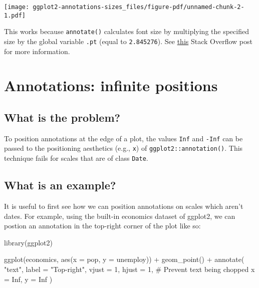 \documentclass[
  letterpaper,
  DIV=11,
  numbers=noendperiod]{scrreprt}
\newenvironment{Shaded}{\begin{snugshade}}{\end{snugshade}}
\newcommand{\AttributeTok}[1]{\textcolor[rgb]{0.40,0.45,0.13}{#1}}
\newcommand{\CommentTok}[1]{\textcolor[rgb]{0.37,0.37,0.37}{#1}}
\newcommand{\ConstantTok}[1]{\textcolor[rgb]{0.56,0.35,0.01}{#1}}
\newcommand{\DecValTok}[1]{\textcolor[rgb]{0.68,0.00,0.00}{#1}}
\newcommand{\FunctionTok}[1]{\textcolor[rgb]{0.28,0.35,0.67}{#1}}
\newcommand{\NormalTok}[1]{\textcolor[rgb]{0.00,0.23,0.31}{#1}}
\newcommand{\SpecialCharTok}[1]{\textcolor[rgb]{0.37,0.37,0.37}{#1}}
\newcommand{\StringTok}[1]{\textcolor[rgb]{0.13,0.47,0.30}{#1}}
\begin{document}
\texttt{[image: ggplot2-annotations-sizes\_files/figure-pdf/unnamed-chunk-2-1.pdf]}

This works because \texttt{annotate()} calculates font size by
multiplying the specified size by the global variable \texttt{.pt}
(equal to \texttt{2.845276}). See
\href{https://stackoverflow.com/questions/65076492/ggplot-size-of-annotate-vs-size-of-element-text}{this}
Stack Overflow post for more information.

\chapter{Annotations: infinite
positions}\label{annotations-infinite-positions}

\section{What is the problem?}\label{what-is-the-problem-1}

To position annotations at the edge of a plot, the values \texttt{Inf}
and \texttt{-Inf} can be passed to the positioning aesthetics (e.g.,
\texttt{x}) of \texttt{ggplot2::annotation()}. This technique fails for
scales that are of class \texttt{Date}.

\section{What is an example?}\label{what-is-an-example-1}

It is useful to first see how we can position annotations on scales
which aren't dates. For example, using the built-in economics dataset of
ggplot2, we can postion an annotation in the top-right corner of the
plot like so:

\begin{Shaded}
\begin{Highlighting}[]
\FunctionTok{library}\NormalTok{(ggplot2)}

\FunctionTok{ggplot}\NormalTok{(economics, }\FunctionTok{aes}\NormalTok{(}\AttributeTok{x =}\NormalTok{ pop, }\AttributeTok{y =}\NormalTok{ unemploy)) }\SpecialCharTok{+}
  \FunctionTok{geom\_point}\NormalTok{() }\SpecialCharTok{+}
  \FunctionTok{annotate}\NormalTok{(}
    \StringTok{"text"}\NormalTok{,}
    \AttributeTok{label =} \StringTok{"Top{-}right"}\NormalTok{,}
    \AttributeTok{vjust =} \DecValTok{1}\NormalTok{, }\AttributeTok{hjust =} \DecValTok{1}\NormalTok{, }\CommentTok{\# Prevent text being chopped}
    \AttributeTok{x =} \ConstantTok{Inf}\NormalTok{, }\AttributeTok{y =} \ConstantTok{Inf}
\NormalTok{  )}
\end{Highlighting}
\end{Shaded}
\end{document}
